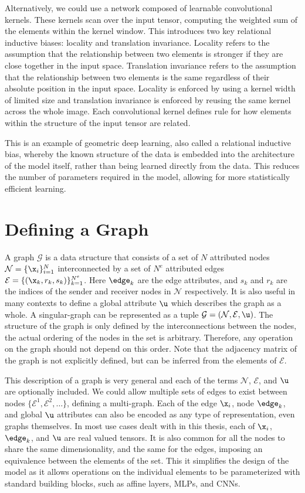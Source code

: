 Alternatively, we could use a network composed of learnable convolutional kernels.
These kernels scan over the input tensor, computing the weighted sum of the elements within the kernel window.
This introduces two key relational inductive biases: locality and translation invariance.
Locality refers to the assumption that the relationship between two elements is stronger if they are close together in the input space.
Translation invariance refers to the assumption that the relationship between two elements is the same regardless of their absolute position in the input space.
Locality is enforced by using a kernel width of limited size and translation invariance is enforced by reusing the same kernel across the whole image.
Each convolutional kernel defines rule for how elements within the structure of the input tensor are related.

This is an example of geometric deep learning, also called a relational inductive bias, whereby the known structure of the data is embedded into the architecture of the model itself, rather than being learned directly from the data.
This reduces the number of parameters required in the model, allowing for more statistically efficient learning.

\section{Defining a Graph}

A graph $\mathcal{G}$ is a data structure that consists of a set of $N$ attributed nodes $\mathcal{N} = \{\x_i\}_{i=1}^{N}$ interconnected by a set of $N^e$ attributed edges $\mathcal{E} = \{(\x_k, r_k, s_k)\}_{k=1}^{N^e}$.
Here $\edge_k$ are the edge attributes, and $s_k$ and $r_k$ are the indices of the sender and receiver nodes in $\mathcal{N}$ respectively.
It is also useful in many contexts to define a global attribute $\u$ which describes the graph as a whole.
A singular-graph can be represented as a tuple $\mathcal{G} = (\mathcal{N}, \mathcal{E}, \u)$.
The structure of the graph is only defined by the interconnections between the nodes, the actual ordering of the nodes in the set is arbitrary.
Therefore, any operation on the graph should not depend on this order.
Note that the adjacency matrix of the graph is not explicitly defined, but can be inferred from the elements of $\mathcal{E}$.

This description of a graph is very general and each of the terms $\mathcal{N}$, $\mathcal{E}$, and $\u$ are optionally included.
We could allow multiple sets of edges to exist between nodes $\{\mathcal{E}^1, \mathcal{E}^2, \ldots\}$, defining a multi-graph.
Each of the edge $\x_i$, node $\edge_{k}$, and global $\u$ attributes can also be encoded as any type of representation, even graphs themselves.
In most use cases dealt with in this thesis, each of $\x_i$, $\edge_k$, and $\u$ are real valued tensors.
It is also common for all the nodes to share the same dimensionality, and the same for the edges, imposing an equivalence between the elements of the set.
This it simplifies the design of the model as it allows operations on the individual elements to be parameterized with standard building blocks, such as affine layers, MLPs, and CNNs.

